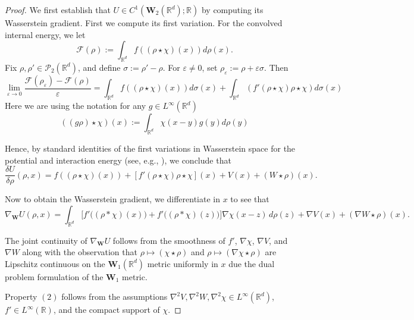 \documentclass[11pt,a4paper]{amsart}
\def\e{\varepsilon}
\newcommand{\1}{\mathds{1}}
\newcommand{\R}{{\mathbb R}}
\numberwithin{equation}{section}
\begin{document}
\begin{proof}

We first establish that $U \in C^1\left(\mathbf{W}_2(\mathbb{R}^d); \mathbb{R}\right)$ by computing its Wasserstein gradient. First we compute its first variation. For the convolved internal energy, we let
\[ \mathcal{F}(\rho) := \int_{\R^d} f( (\rho \star \chi)(x) ) d\rho(x). \]
Fix $\rho, \rho' \in \mathcal{P}_2(\mathbb{R}^d)$, and define $\sigma := \rho' - \rho$. For $\varepsilon \neq 0$, set $\rho_\varepsilon := \rho + \varepsilon \sigma$. Then
\[
\lim_{\varepsilon \to 0} \frac{\mathcal{F}(\rho_{\e}) - \mathcal{F}(\rho)}{\e}
= \int_{\R^d}  f( (\rho \star \chi)(x) )d\sigma(x) + \int_{\R^d} \left( f'(\rho \star \chi)\rho \star \chi \right) d\sigma(x) 
\] Here we are using the notation for any $g \in L^{\infty}(\R^d)$
\[ \left((g \rho) \star \chi\right)(x) := \int_{\R^d} \chi(x-y) g(y) d\rho(y) \]


Hence, by standard identities of the first variations in Wasserstein space for the potential and interaction energy (see, e.g., \cite{santambrogio2017euclidean}), we conclude that
\[
\frac{\delta U}{\delta \rho}(\rho, x)
=
f((\rho \star \chi)(x)) + \left[f'\left(\rho \star \chi\right)\rho \star \chi\right](x)
+ V(x)
+ (W \star \rho)(x).
\]

Now to obtain the Wasserstein gradient, we differentiate in $x$ to see that
\begin{equation}
\nabla_{\mathbf{W}} U(\rho, x) = \int_{\mathbb{R}^d} \!\!\bigl[ f'\bigl((\rho * \chi)(x)\bigr) + f'\bigl((\rho * \chi)(z)\bigr) \bigr] \nabla \chi(x - z)\, d\rho(z) + \nabla V(x) + (\nabla W \star \rho)(x). \label{U_wasserstein_gradient}
\end{equation}

\noindent The joint continuity of $ \nabla_{\mathbf{W}} U $ follows from the smoothness of $ f' $, $ \nabla \chi $, $ \nabla V $, and $ \nabla W $ along with the observation that $\rho \mapsto  (\chi \star \rho)$  and $\rho \mapsto (\nabla \chi \star \rho)$ are Lipschitz continuous on the $\mathbf{W}_1(\mathbb{R}^d)$ metric uniformly in $x$ due the dual problem formulation of the $\mathbf{W}_1$ metric.  \smallskip

Property $(2)$ follows from the assumptions $ \nabla^2 V, \nabla^2 W, \nabla^2 \chi \in L^\infty(\mathbb{R}^d) $, $ f' \in L^\infty(\mathbb{R}) $, and the compact support of $ \chi $. 

\smallskip


\end{proof}
\end{document}
